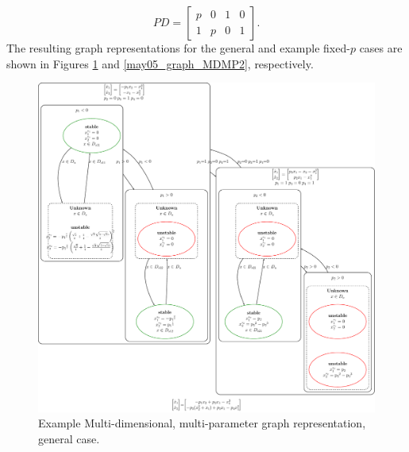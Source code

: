 \documentclass[12pt]{article}
\begin{document}
\begin{equation}
PD=\begin{bmatrix}
    p & 0 & 1 & 0\\
    1 & p & 0 & 1
\end{bmatrix}.
\end{equation}
The resulting graph representations for the general and example fixed-$p$ cases are shown in Figures \ref{may05_graph_MDMP1} and \ref{may05_graph_MDMP2}, respectively.

\begin{figure}[H]
\begin{center}
\includegraphics[width=6in]{may05_graph_MDMP1.pdf}
\caption{Example Multi-dimensional, multi-parameter graph representation, general case.}
\label{may05_graph_MDMP1}
\end{center}
\end{figure}
\end{document}
